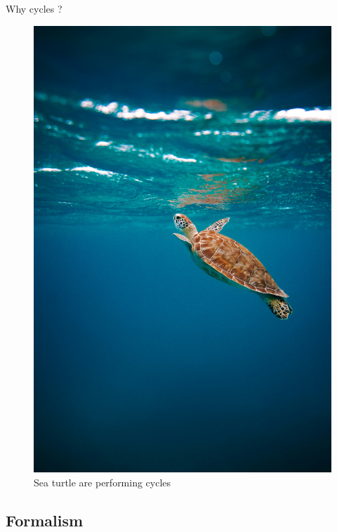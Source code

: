 \documentclass[10pt, xcolor={usenames, dvipsnames}]{beamer}
\begin{document}
\begin{frame}{Why cycles ?}
\begin{minipage}[c]{.35\textwidth}
\begin{figure}
                    \includegraphics[width=\textwidth]{imgs/turtle.jpg}
                    \caption{Sea turtle are performing cycles}
                \end{figure}
            \end{minipage}
        \end{frame}

    \subsection{Formalism}
\end{document}
